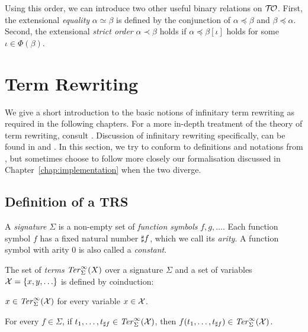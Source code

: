 Using this order, we can introduce two other useful binary relations
on $\mathcal{T\!O}$. First, the extensional \emph{equality} $\alpha \simeq
\beta$ is defined by the conjunction of $\alpha \preceq \beta$ and
$\beta \preceq \alpha$. Second, the extensional \emph{strict order}
$\alpha \prec \beta$ holds if $\alpha \preceq \beta[\iota]$ holds for
some $\iota \in \Phi(\beta)$.



\section{Term Rewriting}\label{sec:rewriting}

We give a short introduction to the basic notions of infinitary term
rewriting as required in the following chapters. For a more in-depth
treatment of the theory of term rewriting, consult
\citet{terese-03}. Discussion of infinitary rewriting specifically,
can be found in \citet[Chapter 12]{terese-03} and
\citet{klop-de-vrijer-05}. In this section, we try to conform to
definitions and notations from \citet{terese-03}, but sometimes choose
to follow more closely our \Coq formalisation discussed in
Chapter~\ref{chap:implementation} when the two diverge.

\subsection{Definition of a TRS}\label{sub:trs}

\begin{definition}%
A \emph{signature} $\Sigma$ is a non-empty set of \emph{function symbols} $f,
g, \ldots$. Each function symbol $f$ has a fixed natural number
$\sharp f$, which we call its \emph{arity}. A function symbol with
arity $0$ is also called a \emph{constant}.
\end{definition}

\begin{definition}%
The set of \emph{terms} $\mathit{Ter}_\Sigma^\infty(X)$ over a signature $\Sigma$ and a
set of variables $\mathcal{X} = \{x, y, \ldots\}$ is defined by coinduction:
\begin{compactenum}
  \item
    $x \in \mathit{Ter}_\Sigma^\infty(\mathcal{X})$ for every variable $x \in \mathcal{X}$.
  \item
    For every $f \in \Sigma$, if $t_1, \ldots, t_{\sharp f} \in
    \mathit{Ter}_\Sigma^\infty(\mathcal{X})$, then $f(t_1, \ldots, t_{\sharp f}) \in \mathit{Ter}_\Sigma^\infty(\mathcal{X})$.
\end{compactenum}
\end{definition}


